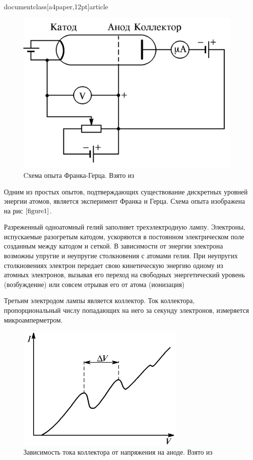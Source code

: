 \\documentclass[a4paper,12pt]{article}
\begin{document}
\begin{figure} 
	\includegraphics[width=\linewidth]{fig1}
	\caption{Cхема опыта Франка-Герца. Взято из \cite{lab}}
	\label{figure1}
\end{figure}

Одним из простых опытов, подтверждающих существование дискретных уровней энергии атомов, является эксперимент Франка и Герца. Схема опыта изображена на рис $\ref{figure1}$.

Разреженный одноатомный гелий заполняет трехэлектродную лампу. Электроны, испускаемые разогретым катодом, ускоряются в постоянном электрическом поле  созданным между катодом и сеткой. В зависимости от энергии электрона возможны упругие и неупругие столкновения с атомами гелия. При неупругих столкновениях электрон передает свою кинетическую энергию одному из атомных электронов, вызывая его переход на свободных энергетический уровень (возбуждение) или совсем отрывая его от атома (ионизация)

Третьим электродом лампы является коллектор. Ток коллектора, пропорциональный числу попадающих на него за секунду электронов, измеряется микроамперметром.

\begin{figure} 
	\includegraphics[width=\linewidth]{fig2}
	\caption{Зависимость тока коллектора от напряжения на аноде. Взято из \cite{lab}}
	\label{figure2}
\end{figure}
\end{document}

